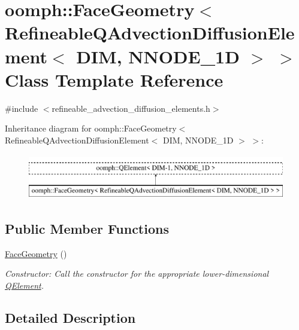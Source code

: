 \hypertarget{classoomph_1_1FaceGeometry_3_01RefineableQAdvectionDiffusionElement_3_01DIM_00_01NNODE__1D_01_4_01_4}{}\section{oomph\+:\+:Face\+Geometry$<$ Refineable\+Q\+Advection\+Diffusion\+Element$<$ D\+IM, N\+N\+O\+D\+E\+\_\+1D $>$ $>$ Class Template Reference}
\label{classoomph_1_1FaceGeometry_3_01RefineableQAdvectionDiffusionElement_3_01DIM_00_01NNODE__1D_01_4_01_4}


{\ttfamily \#include $<$refineable\+\_\+advection\+\_\+diffusion\+\_\+elements.\+h$>$}

Inheritance diagram for oomph\+:\+:Face\+Geometry$<$ Refineable\+Q\+Advection\+Diffusion\+Element$<$ D\+IM, N\+N\+O\+D\+E\+\_\+1D $>$ $>$\+:\begin{figure}[H]
\begin{center}
\leavevmode
\includegraphics[height=2.000000cm]{classoomph_1_1FaceGeometry_3_01RefineableQAdvectionDiffusionElement_3_01DIM_00_01NNODE__1D_01_4_01_4}
\end{center}
\end{figure}
\subsection*{Public Member Functions}
\begin{DoxyCompactItemize}
\item 
\hyperlink{classoomph_1_1FaceGeometry_3_01RefineableQAdvectionDiffusionElement_3_01DIM_00_01NNODE__1D_01_4_01_4_ab7265f3b6f11b7778b123876388f5d46}{Face\+Geometry} ()
\begin{DoxyCompactList}\small\item\em Constructor\+: Call the constructor for the appropriate lower-\/dimensional \hyperlink{classoomph_1_1QElement}{Q\+Element}. \end{DoxyCompactList}\end{DoxyCompactItemize}


\subsection{Detailed Description}
